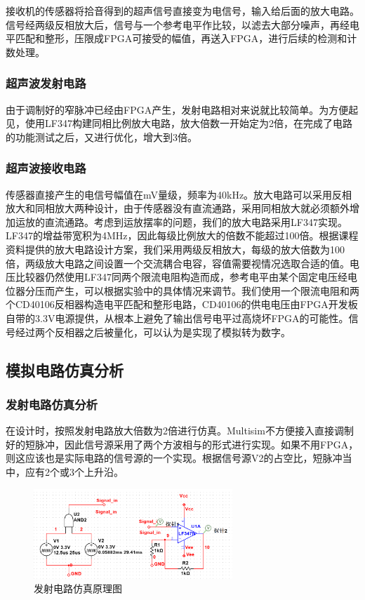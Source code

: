 \documentclass[a4paper, twocolumn]{ctexart}
\begin{document}
接收机的传感器将拾音得到的超声信号直接变为电信号，输入给后面的放大电路。信号经两级反相放大后，信号与一个参考电平作比较，以滤去大部分噪声，再经电平匹配和整形，压限成FPGA可接受的幅值，再送入FPGA，进行后续的检测和计数处理。

\subsubsection{超声波发射电路}

由于调制好的窄脉冲已经由FPGA产生，发射电路相对来说就比较简单。为方便起见，使用LF347构建同相比例放大电路，放大倍数一开始定为2倍，在完成了电路的功能测试之后，又进行优化，增大到3倍。

\subsubsection{超声波接收电路}

传感器直接产生的电信号幅值在mV量级，频率为40kHz。放大电路可以采用反相放大和同相放大两种设计，由于传感器没有直流通路，采用同相放大就必须额外增加运放的直流通路。考虑到运放摆率的问题，我们的放大电路采用LF347实现。LF347的增益带宽积为4MHz，因此每级比例放大的倍数不能超过100倍。根据课程资料提供的放大电路设计方案，我们采用两级反相放大，每级的放大倍数为100倍，两级放大电路之间设置一个交流耦合电容，容值需要视情况选取合适的值。电压比较器仍然使用LF347同两个限流电阻构造而成，参考电平由某个固定电压经电位器分压而产生，可以根据实验中的具体情况来调节。我们使用一个限流电阻和两个CD40106反相器构造电平匹配和整形电路，CD40106的供电电压由FPGA开发板自带的3.3V电源提供，从根本上避免了输出信号电平过高烧坏FPGA的可能性。信号经过两个反相器之后被量化，可以认为是实现了模拟转为数字。

\subsection{模拟电路仿真分析}

\subsubsection{发射电路仿真分析}

在设计时，按照发射电路放大倍数为2倍进行仿真。Multisim不方便接入直接调制好的短脉冲，因此信号源采用了两个方波相与的形式进行实现。如果不用FPGA，则这应该也是实际电路的信号源的一个实现。根据信号源V2的占空比，短脉冲当中，应有2个或3个上升沿。

\begin{figure}[ht]
    \centering
    \includegraphics[width=7.5cm]{../assets/发射电路仿真原理图.png}
    \caption{发射电路仿真原理图}
    \label{fig:tran_sim_sch}
\end{figure}
\end{document}
